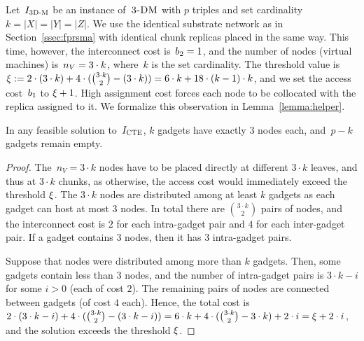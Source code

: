 Let~$I_{\mathrm{\textsc{3D-M}}}$ be an instance of~$\textsc{3-DM}$ with $p$ triples and set cardinality $k = |X| = |Y| = |Z|$.
We use the identical substrate network as in Section~\ref{ssec:fprsma} with
identical chunk replicas placed in the same way.
This time, however, the interconnect cost is~$b_2 = 1$, and the number of nodes (virtual machines) is~$n_V = 3 \cdot k$, where~$k$ is the set cardinality.
The threshold value is $\xi :=  2\cdot (3\cdot k) + 4\cdot({ 3\cdot k \choose 2} - (3\cdot k)) = 6\cdot k + 18\cdot (k-1)\cdot k$, and we set the access cost~$b_1$ to $\xi + 1$.
High assignment cost forces each node to be collocated with the replica assigned to it.
We formalize this observation in Lemma~\ref{lemma:helper}.
\begin{lemma}\label{lemma:helper}
In any feasible solution to~$I_{\mathrm{\textsc{CTE}}}$, $k$ gadgets have exactly
$3$ nodes each, and~$p-k$ gadgets remain empty.
\end{lemma}
\begin{proof}
The~$n_V = 3\cdot k$ nodes have to be placed
directly at different $3\cdot k$ leaves, and thus at $3\cdot k$ chunks, as otherwise, the access cost would immediately exceed the threshold $\xi$.
The $3\cdot k$ nodes are distributed among at least $k$ gadgets as each gadget can host at most $3$ nodes.
In total there are ${3\cdot k \choose 2}$ pairs of nodes,
and the interconnect cost is $2$ for each intra-gadget pair and $4$ for each inter-gadget pair.
If a gadget contains $3$ nodes, then it has $3$ intra-gadget pairs.

Suppose that nodes were distributed among more than $k$ gadgets.
Then, some gadgets contain less than $3$ nodes, and the number of intra-gadget pairs is $3\cdot k - i$ for some $i>0$ (each of cost $2$).
The remaining pairs of nodes are connected between gadgets (of cost $4$ each).
Hence, the total cost is $2\cdot (3\cdot k - i) + 4 \cdot ({3 \cdot k \choose 2} - (3\cdot k - i)) = 6\cdot k + 4 \cdot ({3 \cdot k \choose 2} - 3\cdot k) + 2\cdot i = \xi + 2\cdot i$, and the solution exceeds the threshold $\xi$.
\end{proof}

